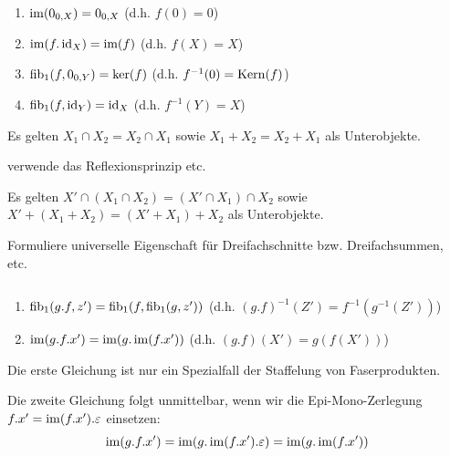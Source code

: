 \begin{lemm}[Regel (a)] $\quad$ %
\begin{enumerate}
\item $\operatorname{im}(0_{0,X}) = 0_{0,X}$ (d.h. $f(0) = 0$)
\item $\operatorname{im}(f.\operatorname{id}_X) = \operatorname{im}(f)$ (d.h. $f(X) = X$)
\item $\operatorname{fib}_1(f,0_{0,Y}) = \ker(f)$ (d.h. $f^{-1}(0) = \operatorname{Kern}(f)$)
\item $\operatorname{fib}_1(f,\operatorname{id}_Y) = \operatorname{id}_X$ (d.h. $f^{-1}(Y) = X$)
\end{enumerate}
\end{lemm}

\begin{lemm}[Regel (b)]
Es gelten $X_1 \cap X_2 = X_2 \cap X_1$
sowie $X_1 + X_2 = X_2 + X_1$ als Unterobjekte.
\end{lemm}
\begin{bew}
verwende das Reflexionsprinzip etc.
\end{bew}

\begin{lemm}[Regel (c)]
Es gelten $X' \cap (X_1 \cap X_2) = (X' \cap X_1) \cap X_2$ 
sowie $X' + (X_1 + X_2) = (X' + X_1) + X_2$ als Unterobjekte.
\end{lemm}
\begin{bew}
Formuliere universelle Eigenschaft für Dreifachschnitte bzw. Dreifachsummen, etc.
\end{bew}

\begin{lemm}[Regel (d)] $\quad$ %
\begin{enumerate}
\item $\operatorname{fib}_1(g.f, z') = \operatorname{fib}_1(f, \operatorname{fib}_1(g, z'))$ (d.h. $(g.f)^{-1}(Z') = f^{-1}(g^{-1}(Z'))$)
\item $\operatorname{im}(g.f.x') = \operatorname{im}(g.\operatorname{im}(f.x'))$ (d.h. $(g.f)(X') = g(f(X'))$)
\end{enumerate}
\end{lemm}
\begin{bew}
Die erste Gleichung ist nur ein Spezialfall der Staffelung von Faserprodukten.

Die zweite Gleichung folgt unmittelbar, wenn wir die Epi-Mono-Zerlegung $f.x' = \operatorname{im}(f.x').\varepsilon$ einsetzen:
\[\operatorname{im}(g.f.x') = \operatorname{im}(g.\operatorname{im}(f.x').\varepsilon) = \operatorname{im}(g.\operatorname{im}(f.x')) \]
\end{bew}

